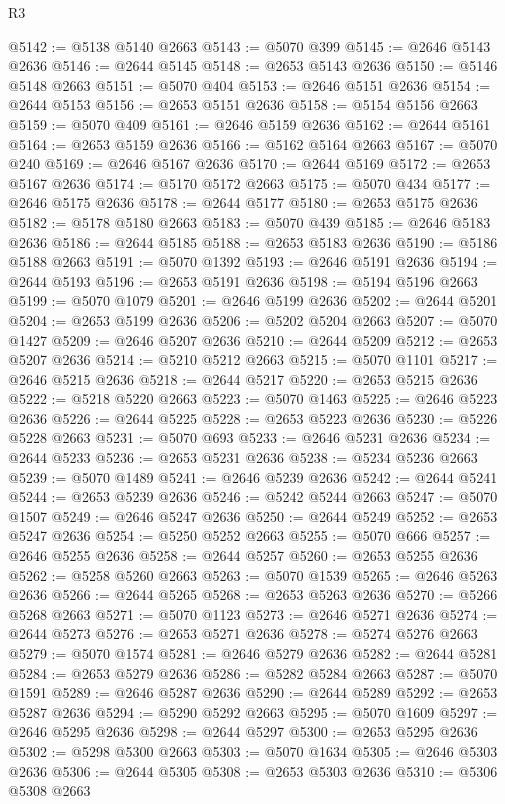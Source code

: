 \begin{lexlean}{R3}
\begin{coremodule}
@5142 := @5138 @5140 @2663
@5143 := @5070 @399
@5145 := @2646 @5143 @2636
@5146 := @2644 @5145
@5148 := @2653 @5143 @2636
@5150 := @5146 @5148 @2663
@5151 := @5070 @404
@5153 := @2646 @5151 @2636
@5154 := @2644 @5153
@5156 := @2653 @5151 @2636
@5158 := @5154 @5156 @2663
@5159 := @5070 @409
@5161 := @2646 @5159 @2636
@5162 := @2644 @5161
@5164 := @2653 @5159 @2636
@5166 := @5162 @5164 @2663
@5167 := @5070 @240
@5169 := @2646 @5167 @2636
@5170 := @2644 @5169
@5172 := @2653 @5167 @2636
@5174 := @5170 @5172 @2663
@5175 := @5070 @434
@5177 := @2646 @5175 @2636
@5178 := @2644 @5177
@5180 := @2653 @5175 @2636
@5182 := @5178 @5180 @2663
@5183 := @5070 @439
@5185 := @2646 @5183 @2636
@5186 := @2644 @5185
@5188 := @2653 @5183 @2636
@5190 := @5186 @5188 @2663
@5191 := @5070 @1392
@5193 := @2646 @5191 @2636
@5194 := @2644 @5193
@5196 := @2653 @5191 @2636
@5198 := @5194 @5196 @2663
@5199 := @5070 @1079
@5201 := @2646 @5199 @2636
@5202 := @2644 @5201
@5204 := @2653 @5199 @2636
@5206 := @5202 @5204 @2663
@5207 := @5070 @1427
@5209 := @2646 @5207 @2636
@5210 := @2644 @5209
@5212 := @2653 @5207 @2636
@5214 := @5210 @5212 @2663
@5215 := @5070 @1101
@5217 := @2646 @5215 @2636
@5218 := @2644 @5217
@5220 := @2653 @5215 @2636
@5222 := @5218 @5220 @2663
@5223 := @5070 @1463
@5225 := @2646 @5223 @2636
@5226 := @2644 @5225
@5228 := @2653 @5223 @2636
@5230 := @5226 @5228 @2663
@5231 := @5070 @693
@5233 := @2646 @5231 @2636
@5234 := @2644 @5233
@5236 := @2653 @5231 @2636
@5238 := @5234 @5236 @2663
@5239 := @5070 @1489
@5241 := @2646 @5239 @2636
@5242 := @2644 @5241
@5244 := @2653 @5239 @2636
@5246 := @5242 @5244 @2663
@5247 := @5070 @1507
@5249 := @2646 @5247 @2636
@5250 := @2644 @5249
@5252 := @2653 @5247 @2636
@5254 := @5250 @5252 @2663
@5255 := @5070 @666
@5257 := @2646 @5255 @2636
@5258 := @2644 @5257
@5260 := @2653 @5255 @2636
@5262 := @5258 @5260 @2663
@5263 := @5070 @1539
@5265 := @2646 @5263 @2636
@5266 := @2644 @5265
@5268 := @2653 @5263 @2636
@5270 := @5266 @5268 @2663
@5271 := @5070 @1123
@5273 := @2646 @5271 @2636
@5274 := @2644 @5273
@5276 := @2653 @5271 @2636
@5278 := @5274 @5276 @2663
@5279 := @5070 @1574
@5281 := @2646 @5279 @2636
@5282 := @2644 @5281
@5284 := @2653 @5279 @2636
@5286 := @5282 @5284 @2663
@5287 := @5070 @1591
@5289 := @2646 @5287 @2636
@5290 := @2644 @5289
@5292 := @2653 @5287 @2636
@5294 := @5290 @5292 @2663
@5295 := @5070 @1609
@5297 := @2646 @5295 @2636
@5298 := @2644 @5297
@5300 := @2653 @5295 @2636
@5302 := @5298 @5300 @2663
@5303 := @5070 @1634
@5305 := @2646 @5303 @2636
@5306 := @2644 @5305
@5308 := @2653 @5303 @2636
@5310 := @5306 @5308 @2663

\end{coremodule}
\end{lexlean}
